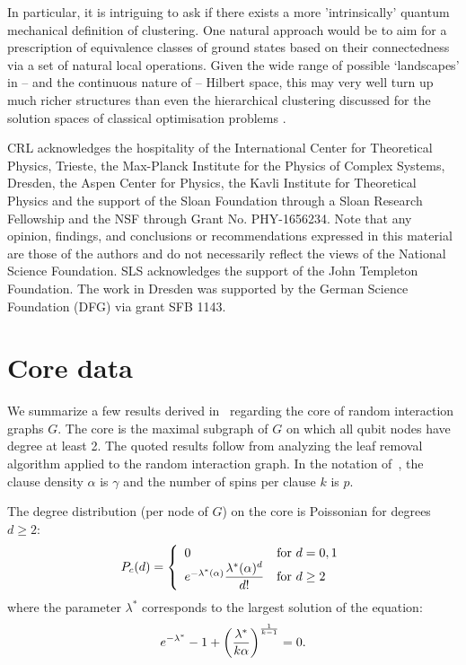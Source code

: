 \documentclass[aps,pra,twocolumn,superscriptaddress,amsmath]{revtex4-1}
\newcommand{\f}[2]{{\ensuremath{\mathchoice%
       {\dfrac{#1}{#2}}
       {\dfrac{#1}{#2}}
       {\frac{#1}{#2}}
       {\frac{#1}{#2}}
       }}}
\begin{document}
In particular, it is intriguing to ask if there exists a more 'intrinsically' quantum mechanical definition of clustering. One natural approach would be to aim for a prescription of equivalence classes of ground states based on their connectedness via a set of natural local operations. 
Given the wide range of possible `landscapes' in -- and the continuous nature of  -- Hilbert space, this may very well turn up much richer structures than even the hierarchical clustering discussed for the solution spaces of classical optimisation problems \cite{SpinGlassTheoryBook1986}. 


\begin{acknowledgments}
CRL acknowledges the hospitality of the International Center for Theoretical Physics, Trieste, the Max-Planck Institute for the Physics of Complex Systems, Dresden, the Aspen Center for Physics, the Kavli Institute for Theoretical Physics and the support of the Sloan Foundation through a Sloan Research Fellowship and the NSF through Grant No. PHY-1656234. 
Note that any opinion, findings, and conclusions or recommendations expressed in this material are those of the authors and do not necessarily reflect the views of the National Science Foundation. SLS acknowledges the support of the John Templeton Foundation. The work in Dresden was supported by the German Science Foundation (DFG) via grant SFB 1143. 
\end{acknowledgments}

%


\appendix

\section{Core data} %
\label{sec:core_data}

We summarize a few results derived in~\cite{Mezard2003} regarding the core of random interaction graphs $G$. The core is the maximal subgraph of $G$ on which all qubit nodes have degree at least 2. The quoted results follow from analyzing the leaf removal algorithm applied to the random interaction graph. 
In the notation of~\cite{Mezard2003}, the clause density $\alpha$ is $\gamma$ and the number of spins per clause $k$ is $p$.

The degree distribution (per node of $G$) on the core is Poissonian for degrees $d\ge 2$:
\begin{align}
	P_c(d) = \left\{ \begin{array}{ll} 0 & \textrm{for } d=0,1\\
	e^{-\lambda^*(\alpha)}\f{\lambda^*(\alpha)^d}{d!} & \textrm{for } d\ge 2 \end{array} \right.
\end{align}
where the parameter $\lambda^*$ corresponds to the largest solution of the equation:
\begin{align}
	e^{-\lambda^*}-1+\left(\f{\lambda^*}{k\alpha}\right)^{\f{1}{k-1}} = 0.
\end{align}
\end{document}
